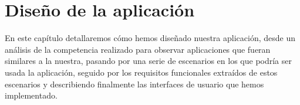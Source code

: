 
\cleardoublepage


\chapter{Diseño de la aplicación}
\label{makereference3}
En este capítulo detallaremos cómo hemos diseñado nuestra aplicación, desde un análisis de la competencia realizado para 
observar aplicaciones que fueran similares a la nuestra, pasando por una serie de escenarios en los que podría ser usada la aplicación, 
seguido por los requisitos funcionales extraídos de estos escenarios y describiendo finalmente las interfaces de usuario que hemos implementado.

